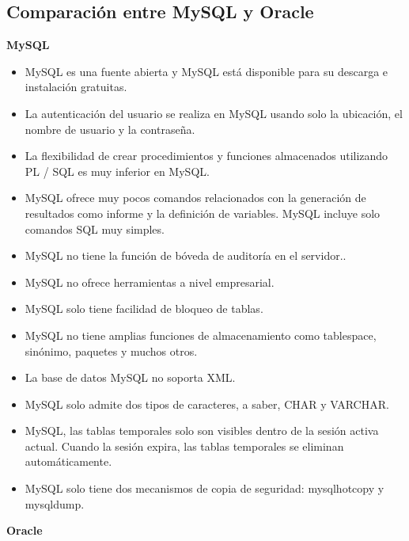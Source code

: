 \documentclass[%
 reprint,
 amsmath,amssymb,
 aps,
]{revtex4-1}
\begin{document}
\subsection{Comparación entre MySQL  y Oracle}
\textbf{MySQL}
\begin{itemize}
		\item MySQL es una fuente abierta y MySQL está disponible para su descarga e instalación gratuitas.
		\item La autenticación del usuario se realiza en MySQL usando solo la ubicación, el nombre de usuario y la contraseña.
		\item La flexibilidad de crear procedimientos y funciones almacenados utilizando PL / SQL es muy inferior en MySQL.
                     \item MySQL ofrece muy pocos comandos relacionados con la generación de resultados como informe y la definición de variables. MySQL incluye solo comandos SQL muy simples.
		\item MySQL no tiene la función de bóveda de auditoría en el servidor..
		\item MySQL no ofrece herramientas a nivel empresarial.
                     \item MySQL solo tiene facilidad de bloqueo de tablas.
		\item MySQL no tiene amplias funciones de almacenamiento como tablespace, sinónimo, paquetes y muchos otros.
		\item La base de datos MySQL no soporta XML.
                      \item MySQL solo admite dos tipos de caracteres, a saber, CHAR y VARCHAR.
		\item MySQL, las tablas temporales solo son visibles dentro de la sesión activa actual. Cuando la sesión expira, las tablas temporales se eliminan automáticamente.
		\item MySQL solo tiene dos mecanismos de copia de seguridad: mysqlhotcopy y mysqldump.
  \end{itemize}
\textbf{Oracle}
\end{document}
